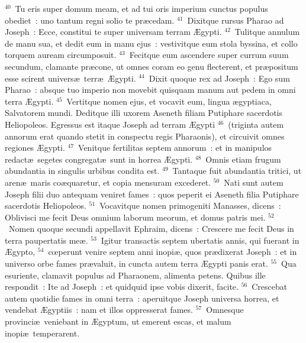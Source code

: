 ${}^{40}$~Tu eris super domum meam, et ad tui oris imperium cunctus populus obediet~: uno tantum regni solio te pr\ae cedam.
${}^{41}$~Dixitque rursus Pharao ad Joseph~: Ecce, constitui te super universam terram \AE gypti.
${}^{42}$~Tulitque annulum de manu sua, et dedit eum in manu ejus~: vestivitque eum stola byssina, et collo torquem auream circumposuit.
${}^{43}$~Fecitque eum ascendere super currum suum secundum, clamante pr\ae cone, ut omnes coram eo genu flecterent, et pr\ae positum esse scirent univers\ae\ terr\ae\ \AE gypti.
${}^{44}$~Dixit quoque rex ad Joseph~: Ego sum Pharao~: absque tuo imperio non movebit quisquam manum aut pedem in omni terra \AE gypti.
${}^{45}$~Vertitque nomen ejus, et vocavit eum, lingua \ae gyptiaca, Salvatorem mundi. Deditque illi uxorem Aseneth filiam Putiphare sacerdotis Heliopoleos. Egressus est itaque Joseph ad terram \AE gypti
${}^{46}$~(triginta autem annorum erat quando stetit in conspectu regis Pharaonis), et circuivit omnes regiones \AE gypti.
${}^{47}$~Venitque fertilitas septem annorum~: et in manipulos redact\ae\ segetes congregat\ae\ sunt in horrea \AE gypti.
${}^{48}$~Omnis etiam frugum abundantia in singulis urbibus condita est.
${}^{49}$~Tantaque fuit abundantia tritici, ut aren\ae\ maris co\ae quaretur, et copia mensuram excederet.
${}^{50}$~Nati sunt autem Joseph filii duo antequam veniret fames~: quos peperit ei Aseneth filia Putiphare sacerdotis Heliopoleos.
${}^{51}$~Vocavitque nomen primogeniti Manasses, dicens~: Oblivisci me fecit Deus omnium laborum meorum, et domus patris mei.
${}^{52}$~Nomen quoque secundi appellavit Ephraim, dicens~: Crescere me fecit Deus in terra paupertatis me\ae .
${}^{53}$~Igitur transactis septem ubertatis annis, qui fuerant in \AE gypto,
${}^{54}$~cœperunt venire septem anni inopi\ae , quos pr\ae dixerat Joseph~: et in universo orbe fames pr\ae valuit, in cuncta autem terra \AE gypti panis erat.
${}^{55}$~Qua esuriente, clamavit populus ad Pharaonem, alimenta petens. Quibus ille respondit~: Ite ad Joseph~: et quidquid ipse vobis dixerit, facite.
${}^{56}$~Crescebat autem quotidie fames in omni terra~: aperuitque Joseph universa horrea, et vendebat \AE gyptiis~: nam et illos oppresserat fames.
${}^{57}$~Omnesque provinci\ae\ veniebant in \AE gyptum, ut emerent escas, et malum inopi\ae\ temperarent.


